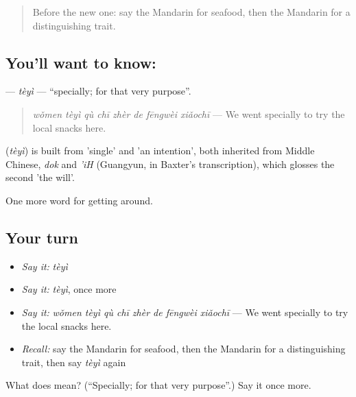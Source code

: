 \label{lesson:ZH-C450-teyi}



\begin{quote}
Before the new one: say the Mandarin for seafood, then the Mandarin for a distinguishing trait.
\end{quote}

\subsection*{You'll want to know: }
\textbf{} — \emph{tèyì} — \textquotedblleft{}specially; for that very purpose\textquotedblright{}.

\begin{quote}
\textbf{} \emph{wǒmen tèyì qù chī zhèr de fēngwèi xiǎochī} — We went specially to try the local snacks here.
\end{quote}

\begin{cousinweb}
\textbf{} (\emph{tèyì}) is built from  'single' and  'an intention', both inherited from Middle Chinese, \emph{dok} and \emph{'iH} (Guangyun, in Baxter's transcription), which glosses the second 'the will'.
\end{cousinweb}

\begin{grammarlens}[title={What you've built}]
One more word for getting around.
\end{grammarlens}

\subsection*{Your turn}
\begin{itemize}
\raggedright
  \item \emph{Say it:} \emph{tèyì}
  \item \emph{Say it:} \emph{tèyì}, once more
  \item \emph{Say it:} \emph{wǒmen tèyì qù chī zhèr de fēngwèi xiǎochī} — We went specially to try the local snacks here.
  \item \emph{Recall:} say the Mandarin for seafood, then the Mandarin for a distinguishing trait, then say \emph{tèyì} again
\end{itemize}

\begin{tcolorbox}[breakable,colback=teal!4,colframe=teal!35!black,title={Before you move on}]
What does  mean? (\textquotedblleft{}Specially; for that very purpose\textquotedblright{}.) Say it once more.
\end{tcolorbox}
